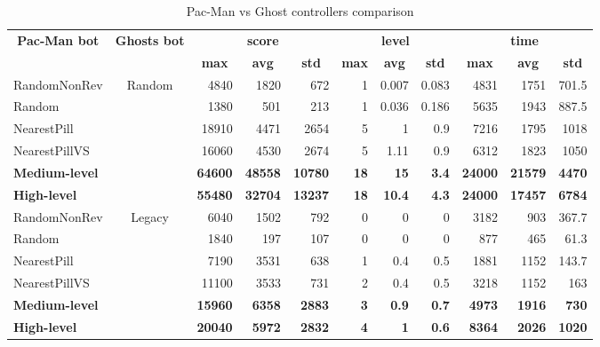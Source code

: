 \documentclass{llncs}
\newcommand{\paco}{Pac-Man }
\begin{document}
\begin{table}[]
\centering
\caption{\paco vs Ghost controllers comparison}
\label{my-label}
\begin{tabular}{|l|c|r|r|r|r|r|r|r|r|r|}
\hline
\multicolumn{1}{|c|}{\multirow{2}{*}{\textbf{Pac-Man bot}}} & \multirow{2}{*}{\textbf{Ghosts bot}} & \multicolumn{3}{c|}{\textbf{score}} & \multicolumn{3}{c|}{\textbf{level}} & \multicolumn{3}{c|}{\textbf{time}} \\ \cline{3-11} 
\multicolumn{1}{|c|}{} &  & \multicolumn{1}{c|}{\textbf{max}} & \multicolumn{1}{c|}{\textbf{avg}} & \multicolumn{1}{c|}{\textbf{std}} & \multicolumn{1}{c|}{\textbf{max}} & \multicolumn{1}{c|}{\textbf{avg}} & \multicolumn{1}{c|}{\textbf{std}} & \multicolumn{1}{c|}{\textbf{max}} & \multicolumn{1}{c|}{\textbf{avg}} & \multicolumn{1}{c|}{\textbf{std}} \\ \hline
RandomNonRev & \multirow{6}{*}{Random} & 4840 & 1820 & 672 & 1 & 0.007 & 0.083 & 4831 & 1751 & 701.5 \\ \cline{1-1} \cline{3-11} 
Random &  & 1380 & 501 & 213 & 1 & 0.036 & 0.186 & 5635 & 1943 & 887.5 \\ \cline{1-1} \cline{3-11} 
NearestPill &  & 18910 & 4471 & 2654 & 5 & 1 & 0.9 & 7216 & 1795 & 1018 \\ \cline{1-1} \cline{3-11} 
NearestPillVS &  & 16060 & 4530 & 2674 & 5 & 1.11 & 0.9 & 6312 & 1823 & 1050 \\ \cline{1-1} \cline{3-11} 
\textbf{Medium-level} &  & \textbf{64600} & \textbf{48558} & \textbf{10780} & \textbf{18} & \textbf{15} & \textbf{3.4} & \textbf{24000} & \textbf{21579} & \textbf{4470} \\ \cline{1-1} \cline{3-11} 
\textbf{High-level} &  & \textbf{55480} & \textbf{32704} & \textbf{13237} & \textbf{18} & \textbf{10.4} & \textbf{4.3} & \textbf{24000} & \textbf{17457} & \textbf{6784} \\ \hline
RandomNonRev & \multirow{6}{*}{Legacy} & 6040 & 1502 & 792 & 0 & 0 & 0 & 3182 & 903 & 367.7 \\ \cline{1-1} \cline{3-11} 
Random &  & 1840 & 197 & 107 & 0 & 0 & 0 & 877 & 465 & 61.3 \\ \cline{1-1} \cline{3-11} 
NearestPill &  & 7190 & 3531 & 638 & 1 & 0.4 & 0.5 & 1881 & 1152 & 143.7 \\ \cline{1-1} \cline{3-11} 
NearestPillVS &  & 11100 & 3533 & 731 & 2 & 0.4 & 0.5 & 3218 & 1152 & 163 \\ \cline{1-1} \cline{3-11} 
\textbf{Medium-level} &  & \textbf{15960} & \textbf{6358} & \textbf{2883} & \textbf{3} & \textbf{0.9} & \textbf{0.7} & \textbf{4973} & \textbf{1916} & \textbf{730} \\ \cline{1-1} \cline{3-11} 
\textbf{High-level} &  & \textbf{20040} & \textbf{5972} & \textbf{2832} & \textbf{4} & \textbf{1} & \textbf{0.6} & \textbf{8364} & \textbf{2026} & \textbf{1020} \\ \hline
\end{tabular}
\end{table}
\end{document}
